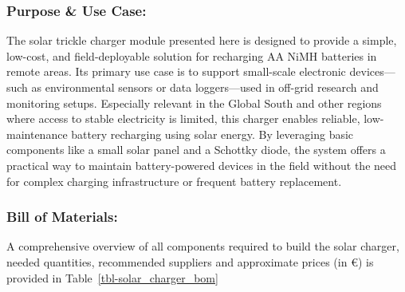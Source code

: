 \documentclass[
  11pt,
  letterpaper,
]{book}
\begin{document}
\subsubsection{Purpose \& Use Case:}\label{sec-solar-charger-purpose}

The solar trickle charger module presented here is designed to provide a
simple, low-cost, and field-deployable solution for recharging AA NiMH
batteries in remote areas. Its primary use case is to support
small-scale electronic devices---such as environmental sensors or data
loggers---used in off-grid research and monitoring setups. Especially
relevant in the Global South and other regions where access to stable
electricity is limited, this charger enables reliable, low-maintenance
battery recharging using solar energy. By leveraging basic components
like a small solar panel and a Schottky diode, the system offers a
practical way to maintain battery-powered devices in the field without
the need for complex charging infrastructure or frequent battery
replacement.

\subsubsection{Bill of Materials:}\label{sec-solar-charger-bom}

A comprehensive overview of all components required to build the solar
charger, needed quantities, recommended suppliers and approximate prices
(in €) is provided in Table~\ref{tbl-solar_charger_bom}
\end{document}

